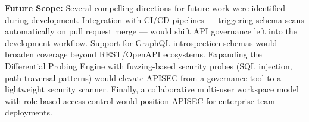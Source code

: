 \documentclass{fisatprojectfinal}
\begin{document}
\textbf{Future Scope:} Several compelling directions for future work were identified during development. Integration with CI/CD pipelines — triggering schema scans automatically on pull request merge — would shift API governance left into the development workflow. Support for GraphQL introspection schemas would broaden coverage beyond REST/OpenAPI ecosystems. Expanding the Differential Probing Engine with fuzzing-based security probes (SQL injection, path traversal patterns) would elevate APISEC from a governance tool to a lightweight security scanner. Finally, a collaborative multi-user workspace model with role-based access control would position APISEC for enterprise team deployments.

\renewcommand\bibname{References}


\end{document}
